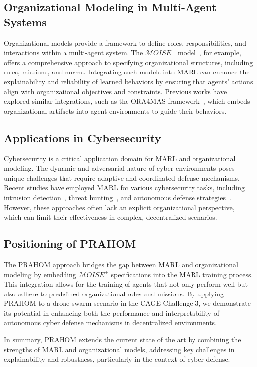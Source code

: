 \documentclass[conference]{IEEEtran}
\begin{document}
\subsection{Organizational Modeling in Multi-Agent Systems}
Organizational models provide a framework to define roles, responsibilities, and interactions within a multi-agent system. The $\mathcal{M}OISE^+$ model~\cite{hubner2007jacamo}, for example, offers a comprehensive approach to specifying organizational structures, including roles, missions, and norms. Integrating such models into MARL can enhance the explainability and reliability of learned behaviors by ensuring that agents' actions align with organizational objectives and constraints. Previous works have explored similar integrations, such as the ORA4MAS framework~\cite{boissier2013ora4mas}, which embeds organizational artifacts into agent environments to guide their behaviors.

\subsection{Applications in Cybersecurity}
Cybersecurity is a critical application domain for MARL and organizational modeling. The dynamic and adversarial nature of cyber environments poses unique challenges that require adaptive and coordinated defense mechanisms. Recent studies have employed MARL for various cybersecurity tasks, including intrusion detection~\cite{gomes2019dynamic}, threat hunting~\cite{nguyen2021reinforcement}, and autonomous defense strategies~\cite{zhang2020multi}. However, these approaches often lack an explicit organizational perspective, which can limit their effectiveness in complex, decentralized scenarios.

\subsection{Positioning of PRAHOM}
The PRAHOM approach bridges the gap between MARL and organizational modeling by embedding $\mathcal{M}OISE^+$ specifications into the MARL training process. This integration allows for the training of agents that not only perform well but also adhere to predefined organizational roles and missions. By applying PRAHOM to a drone swarm scenario in the CAGE Challenge 3, we demonstrate its potential in enhancing both the performance and interpretability of autonomous cyber defense mechanisms in decentralized environments.

In summary, PRAHOM extends the current state of the art by combining the strengths of MARL and organizational models, addressing key challenges in explainability and robustness, particularly in the context of cyber defense.
\end{document}
